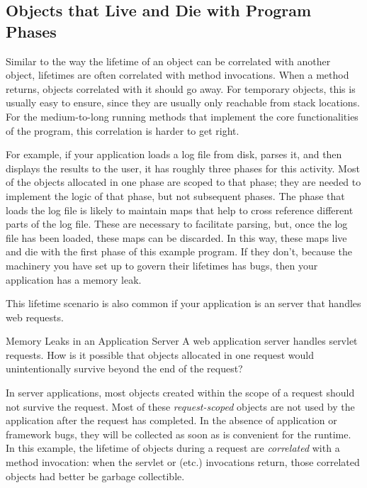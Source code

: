 \subsection{Objects that Live and Die with Program Phases}
\label{sec:correlated-lifetime-2}

Similar to the way the lifetime of an object can be correlated with another
object, lifetimes are often correlated with method invocations. When a method
returns, objects correlated with it should go away. For temporary objects, this
is usually easy to ensure, since they are usually only reachable from stack
locations. For the medium-to-long running methods that implement the
core functionalities of the program, this correlation is harder to get right.

For example, if your application loads a log file from disk,
parses it, and then displays the results to the user, it has roughly three
phases for this activity. Most of the objects allocated in one phase are scoped to that
phase; they are needed to implement the logic of that phase, but not subsequent
phases. The phase that loads the log file is likely to maintain maps that
help to cross reference different parts of the log file. These are necessary
to facilitate parsing, but, once the log file has been loaded, these maps can be
discarded. In this way, these maps live and die with the first phase of this
example program. If they don't, because the machinery you have set up to
govern their lifetimes has bugs, then your application has a memory
leak.

This lifetime scenario is also common if your application is an
server that handles web requests.

\begin{example}{Memory Leaks in an Application Server}
	A web application server handles servlet requests. How is it possible that
	objects allocated in one request would unintentionally survive beyond the end
	of the request?
\end{example} 
  
In server applications, most
objects created within the scope of a request should not survive the
request. Most of these \emph{request-scoped}
 objects are not used by the application after the
request has completed. In the absence of application or framework bugs, they will
be collected as soon as is convenient for the runtime. In this example, the
lifetime of objects during a request are \emph{correlated} with a method
invocation: when the servlet  or  (etc.) invocations
return, those correlated objects had better be garbage collectible.

